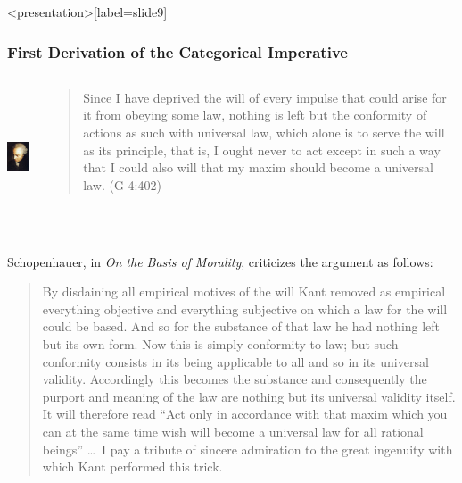 % 

\begin{frame}<presentation>[label=slide9]
    \frametitle{First Derivation of the Categorical Imperative}
        \begin{columns}
            \begin{column}{3cm}
                \includegraphics[height=4cm]{../../graphics/kant.jpg}
            \end{column}
            \begin{column}{7cm}
                \begin{quote}
                	Since I have deprived the will of every impulse that could arise for it from obeying some law, nothing is left but the conformity of actions as such with universal law, which alone is to serve the will as its principle, that is, I ought never to act except in such a way that I could also will that my maxim should become a universal law. (G 4:402)
                \end{quote}
            \end{column}
        \end{columns}
\end{frame}

Schopenhauer, in \emph{On the Basis of Morality}, criticizes the argument as follows:

\begin{quote}
	By disdaining all empirical motives of the will Kant removed as empirical everything objective and everything subjective on which a law for the will could be based. And so for the substance of that law he had nothing left but its own form. Now this is simply conformity to law; but such conformity consists in its being applicable to all and so in its universal validity. Accordingly this becomes the substance and consequently the purport and meaning of the law are nothing but its universal validity itself. It will therefore read ``Act only in accordance with that maxim which you can at the same time wish will become a universal law for all rational beings'' \ldots\ I pay a tribute of sincere admiration to the great ingenuity with which Kant performed this trick.
\end{quote}

